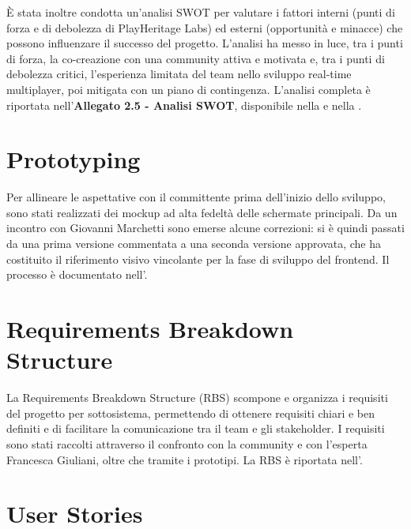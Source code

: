 È stata inoltre condotta un'analisi SWOT per valutare i fattori interni (punti di forza e di debolezza di PlayHeritage Labs) ed esterni (opportunità e minacce) che possono influenzare il successo del progetto. L'analisi ha messo in luce, tra i punti di forza, la co-creazione con una community attiva e motivata e, tra i punti di debolezza critici, l'esperienza limitata del team nello sviluppo real-time multiplayer, poi mitigata con un piano di contingenza. L'analisi completa è riportata nell'\textbf{Allegato 2.5 - Analisi SWOT}, disponibile nella  e nella .

\section{Prototyping}

Per allineare le aspettative con il committente prima dell'inizio dello sviluppo, sono stati realizzati dei mockup ad alta fedeltà delle schermate principali. Da un incontro con Giovanni Marchetti sono emerse alcune correzioni: si è quindi passati da una prima versione commentata a una seconda versione approvata, che ha costituito il riferimento visivo vincolante per la fase di sviluppo del frontend. Il processo è documentato nell'.

\section{Requirements Breakdown Structure}

La Requirements Breakdown Structure (RBS) scompone e organizza i requisiti del progetto per sottosistema, permettendo di ottenere requisiti chiari e ben definiti e di facilitare la comunicazione tra il team e gli stakeholder. I requisiti sono stati raccolti attraverso il confronto con la community e con l'esperta Francesca Giuliani, oltre che tramite i prototipi. La RBS è riportata nell'.

\section{User Stories}

